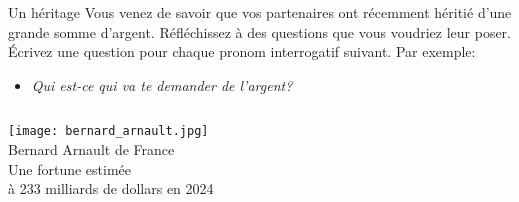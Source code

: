\begin{frame}{Un héritage}
  Vous venez de savoir que vos partenaires ont récemment héritié d'une grande somme d'argent.
  Réfléchissez à des questions que vous voudriez leur poser.
  Écrivez une question pour chaque pronom interrogatif suivant.
  Par exemple: \\
  \begin{itemize}
    \item \emph{Qui est-ce qui va te demander de l'argent?}
  \end{itemize}
  \begin{columns}
      \begin{center}
        \scriptsize
        \texttt{[image: bernard\_arnault.jpg]} \\
        Bernard Arnault de France \\
        Une fortune estimée \\
        à 233 milliards de dollars en 2024
      \end{center}
  \end{columns}
\end{frame}